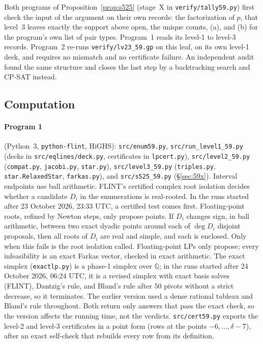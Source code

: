 \documentclass[11pt]{article}
\theoremstyle{definition}
\begin{document}
Both programs of Proposition~\ref{prop:s525} (stage~X in \texttt{verify/tally59.py}) first check the
input of the argument on their own records: the factorization of $p$, that level~3 leaves exactly the
support above open, the unique counts, (a), and (b) for the program's own list of pair types.
Program~1 reads its level-1 to level-3 records.
Program~2 re-runs \texttt{verify/lv23\_59.gp} on this leaf, on its own level-1 deck, and requires no
mismatch and no certificate failure. An independent audit found the same structure and closes the last
step by a backtracking search and CP-SAT instead.

\subsection{Computation}\label{sec:59comp}
\paragraph{Program 1} (Python~3, \texttt{python-flint}, HiGHS): \texttt{src/enum59.py},
\texttt{src/run\_level1\_59.py} (decks in \texttt{src/eqlines/deck.py}, certificates in
\texttt{lpcert.py}), \texttt{src/level2\_59.py} (\texttt{compat.py}, \texttt{jacobi.py},
\texttt{star.py}), \texttt{src/level3\_59.py} (\texttt{triples.py}, \texttt{star.RelaxedStar},
\texttt{farkas.py}), and \texttt{src/s525\_59.py} (\S\ref{sec:59x}). Interval endpoints use ball arithmetic. FLINT's certified complex root isolation
decides whether a candidate $D_i$ in the enumerations is real-rooted. In the runs started after
23 October 2026, 23:33 UTC, a certified test comes first. Floating-point roots, refined by Newton
steps, only propose points. If $D_i$ changes sign, in ball arithmetic, between two exact dyadic
points around each of $\deg D_i$ disjoint proposals, then all roots of $D_i$ are real and simple,
and each is enclosed. Only when this fails is the root isolation called. Floating-point LPs only propose; every infeasibility is an
exact Farkas vector, checked in exact arithmetic. The exact simplex (\texttt{exactlp.py}) is a
phase-1 simplex over $\mathbb Q$; in the runs started after 24 October 2026, 06:24 UTC, it is a
revised simplex with exact basis solves (FLINT), Dantzig's rule, and Bland's rule after $50$ pivots
without a strict decrease, so it terminates. The earlier version used a dense rational tableau and
Bland's rule throughout. Both return only answers that pass the exact check, so the version affects
the running time, not the verdicts. \texttt{src/cert59.py} exports the level-2 and
level-3 certificates in a
point form (rows at the points $-6,\dots,\delta-7$), after an exact self-check that rebuilds every row
from its definition.
\end{document}
